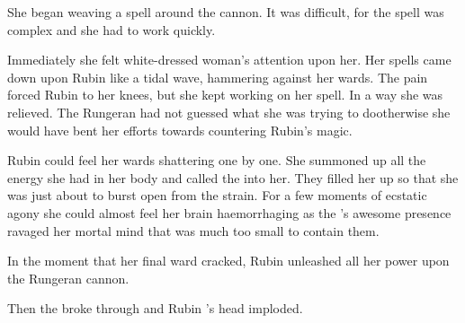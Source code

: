 
She began weaving a spell around the cannon. 
It was difficult, for the spell was complex and she had to work quickly. 

Immediately she felt white-dressed woman's attention upon her. 
Her spells came down upon Rubin like a tidal wave, hammering against her wards. 
The pain forced Rubin to her knees, but she kept working on her spell. 
In a way she was relieved. 
The Rungeran \human had not guessed what she was trying to do\dash otherwise she would have bent her efforts towards countering Rubin's magic. 

Rubin could feel her wards shattering one by one. 
She summoned up all the energy she had in her body and called the \sephiroth into her.
They filled her up so that she was just about to burst open from the strain. 
For a few moments of ecstatic agony she could almost feel her brain haemorrhaging as the \sephiroth's awesome presence ravaged her mortal mind that was much too small to contain them. 

In the moment that her final ward cracked, Rubin unleashed all her power upon the Rungeran cannon. 


Then the \daemons broke through and Rubin \Sanyor's head imploded. 






% 
% 
% 





